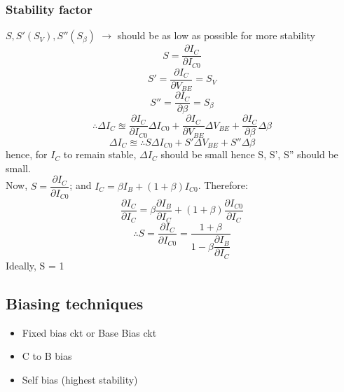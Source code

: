 \documentclass[10pt, a4paper]{report}
\begin{document}
	\subsubsection{Stability factor}
	$ S, S'(S_V), S''(S_\beta) $ $\rightarrow$ should be as low as possible for more stability
	$$ S = \dfrac{\partial I_C}{\partial I_{C0}} $$
	$$ S' = \dfrac{\partial I_C}{\partial V_{BE}} = S_V $$
	$$ S'' = \dfrac{\partial I_C}{\partial \beta} = S_\beta $$
	$$ \therefore \Delta I_C \approxeq \dfrac{\partial I_C}{\partial I_{C0}} \Delta I_{C0} + \dfrac{\partial I_C}{\partial V_{BE}} \Delta V_{BE} + \dfrac{\partial I_C}{\partial {\beta}} \Delta {\beta}$$
	$$ \Delta I_C \approxeq \therefore S \Delta I_{C0} + S' \Delta V_{BE} +S'' \Delta {\beta}$$
	hence, for $ I_C $ to remain stable, $ \Delta I_C $ should be small hence S, S', S'' should be small.\\
	Now, $ S = \dfrac{\partial I_C}{\partial I_{C0}} $; and $ I_C = \beta I_B + (1+\beta) I_{C0} $. Therefore:
	$$ \dfrac{\partial I_C}{\partial I_{C}} = \beta \dfrac{\partial I_B}{\partial I_{C}} + (1+\beta) \dfrac{\partial I_{C0}}{\partial I_{C}} $$
	$$ \therefore S = \dfrac{\partial I_C}{\partial I_{C0}} = \dfrac{1+\beta}{1-\beta \dfrac{\partial I_B}{\partial I_C}} $$
	Ideally, S = 1
	\subsection{Biasing techniques}
	\begin{itemize}
		\item Fixed bias ckt or Base Bias ckt
		\item C to B bias
		\item Self bias (highest stability)
	\end{itemize}
\end{document}
